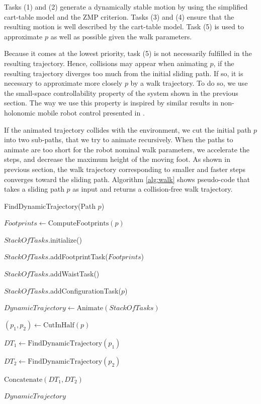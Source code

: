 \documentclass{article}
\begin{document}
Tasks (1)  and (2) generate a  dynamically stable motion  by using the
simplified cart-table model  and the ZMP criterion. Tasks  (3) and (4)
ensure that the  resulting motion is well described  by the cart-table
model. Task (5)  is used to approximate $p$ as  well as possible given
the walk parameters.

Because it comes at the  lowest priority, task (5) is not necessarily
fulfilled in  the resulting trajectory. Hence,  collisions may appear
when animating $p$, if the resulting trajectory diverges too much from
the initial sliding  path. If so, it is  necessary to approximate more
closely $p$  by a walk  trajectory.  To do  so, we use  the small-space
controllability  property   of  the  system  shown   in  the  previous
section. The way  we use this property is  inspired by similar results
in non-holonomic mobile robot control presented in \cite{taix-94}.

If the animated  trajectory collides with the environment,  we cut the
initial  path   $p$  into  two   sub-paths,  that  we  try   to  animate
recursively. When the  paths to animate are too  short for the robot
nominal  walk parameters, we  accelerate the  steps, and  decrease the
maximum height of  the moving foot. As shown  in previous section, the
walk trajectory  corresponding to  smaller and faster  steps converges
toward the  sliding path.  Algorithm  \ref{alg:walk} shows pseudo-code
that takes  a sliding path $p$  as input and  returns a collision-free
walk trajectory.

\begin{algorithm}[h]
\caption{FindDynamicTrajectory(Path $p$)}
\label{alg:walk}
\begin{algorithmic}
\STATE $Footprints \leftarrow \text{ComputeFootprints}(p)$

\STATE $StackOfTasks$.initialize()

\STATE $StackOfTasks$.addFootprintTask($Footprints$)

\STATE $StackOfTasks$.addWaistTask()

\STATE $StackOfTasks$.addConfigurationTask($p$)

\STATE $DynamicTrajectory \leftarrow \text{Animate}(StackOfTasks)$


\STATE $(p_1,p_2) \leftarrow \text{CutInHalf}(p)$

\STATE $DT_1 \leftarrow \text{FindDynamicTrajectory}(p_1)$

\STATE $DT_2 \leftarrow \text{FindDynamicTrajectory}(p_2)$

\RETURN $\text{Concatenate}(DT_1,DT_2)$

\ELSE

\RETURN $DynamicTrajectory$

\ENDIF
\end{algorithmic}
\end{algorithm}
\end{document}
